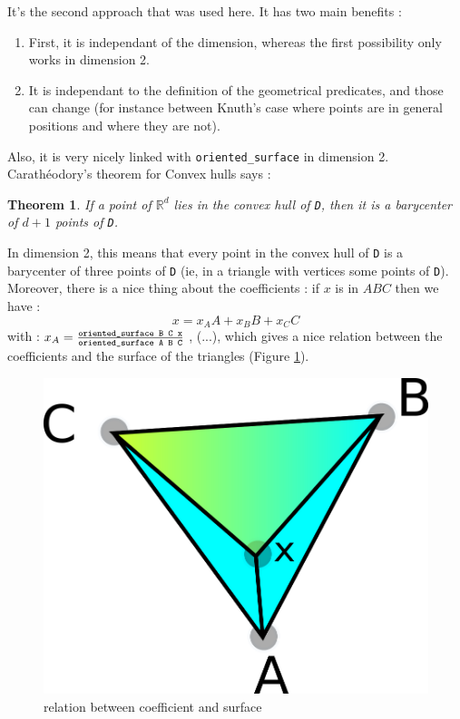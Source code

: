 \documentclass[a4paper,10pt]{article}
\newtheorem{theorem}{Theorem}
\begin{document}
It's the second approach that was used here. It has two main benefits :
\begin{enumerate}
\item First, it is independant of the dimension, whereas the first possibility only works in dimension 2.
\item It is independant to the definition of the geometrical predicates, and those can change (for instance between Knuth's case where points are in general positions and where they are not). 
\end{enumerate}
Also, it is very nicely linked with {\tt oriented\_surface} in dimension 2. Carathéodory's theorem for Convex hulls says :
\begin{theorem}
If a point of $\mathbb{R}^d$ lies in the convex hull of {\tt D}, then it is a barycenter of $d+1$ points of {\tt D}.
\end{theorem}
In dimension 2, this means that every point in the convex hull of {\tt D} is a barycenter of three points of {\tt D} (ie, in a triangle with vertices some points of {\tt D}).
Moreover, there is a nice thing about the coefficients : if $x$ is in $ABC$ then we have :
$$x = x_AA + x_BB + x_CC$$
with : $x_A =\frac{ \text{\tt oriented\_surface B C x}}{\text{\tt oriented\_surface A B C}}$ , (...), which gives a nice relation between the coefficients and the surface of the triangles (Figure \ref{cara}).

\begin{figure}[h]
  \centering
  \caption{\label{cara} relation between coefficient and surface}
  \includegraphics[scale=2]{cara.png}

\end{figure}
\end{document}
